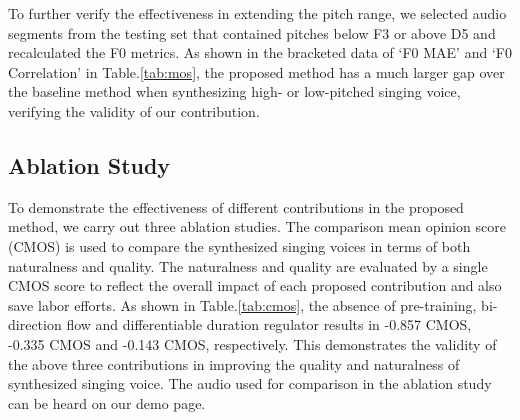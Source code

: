To further verify the effectiveness in extending the pitch range, we selected audio segments from the testing set that contained pitches below F3 or above D5 and recalculated the F0 metrics.
As shown in the bracketed data of `F0 MAE' and `F0 Correlation' in Table.\ref{tab:mos}, the proposed method has a much larger gap over the baseline method when synthesizing high- or low-pitched singing voice, verifying the validity of our contribution.


\subsection{Ablation Study}
To demonstrate the effectiveness of different contributions in the proposed method, we carry out three ablation studies.
The comparison mean opinion score (CMOS) is used to compare the synthesized singing voices in terms of both naturalness and quality.
The naturalness and quality are evaluated by a single CMOS score to reflect the overall impact of each proposed contribution and also save labor efforts.
As shown in Table.\ref{tab:cmos}, the absence of pre-training, bi-direction flow and differentiable duration regulator results in -0.857 CMOS, -0.335 CMOS and -0.143 CMOS, respectively.
This demonstrates the validity of the above three contributions in improving the quality and naturalness of synthesized singing voice.
The audio used for comparison in the ablation study can be heard on our demo page.



\begin{table}[th]
\renewcommand{\arraystretch}{1.1}
  \caption{Ablation study results.}
  \begin{center}

        
  \end{center}
\end{table}

